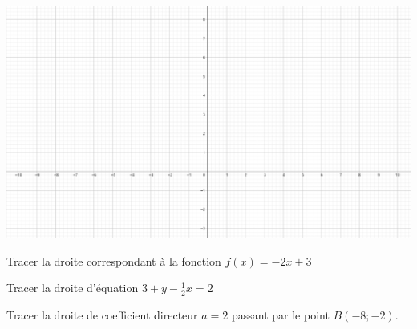 \section{}


\begin{center}
	\includegraphics[scale=0.5]{vide}
\end{center}
\begin{questions}
	
	
	
	\question[2] Tracer la droite correspondant à la fonction $f(x) = -2x + 3$
	
	
	\fillwithdottedlines{3cm}
	
	\question[2]Tracer la droite d'équation $3 + y - \frac{1}{2}x = 2$
%	
	\fillwithdottedlines{3cm}
	
	\question[2] Tracer la droite de coefficient directeur $a = 2$ passant par le point $B(-8; -2)$.
	

\end{questions}

\section{}

